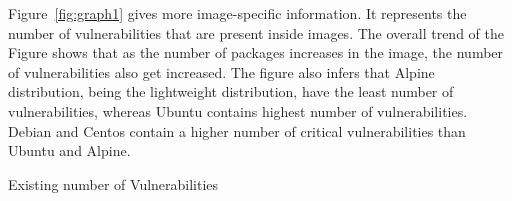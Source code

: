 \documentclass[a4paper,num-refs]{oup-contemporary}
\begin{document}
Figure~\ref{fig:graph1} gives more image-specific information.
It represents the number of vulnerabilities that are present inside images.
The overall trend of the Figure shows that as the number of packages increases in the image, the number of vulnerabilities
also get increased.
The figure also infers that Alpine distribution, being the
lightweight distribution, have the least number of vulnerabilities, whereas Ubuntu contains highest number of
vulnerabilities. Debian and Centos contain a higher number of critical vulnerabilities than Ubuntu and Alpine.
\begin{table}
%
       \centering
	\caption{\label{table1}Existing number of Vulnerabilities}
\end{table}
\end{document}
